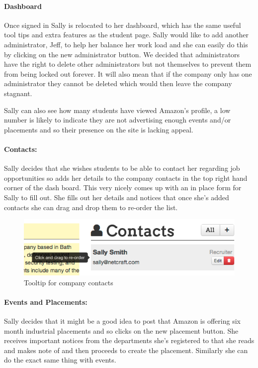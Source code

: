   \paragraph{Dashboard}
    Once signed in Sally is relocated to her dashboard, which has the same useful tool tips and extra features as the student page.
    Sally would like to add another administrator, Jeff, to help her balance her work load and she can easily do this by clicking on the new administrator button. We decided that administrators have the right to delete other administrators but not themselves to prevent them from being locked out forever. It will also mean that if the company only has one administrator they cannot be deleted which would then leave the company stagnant.

    Sally can also see how many students have viewed Amazon's profile, a low number is likely to indicate they are not advertising enough events and/or placements and so their presence on the site is lacking appeal.


  \paragraph{Contacts:}
    Sally decides that she wishes students to be able to contact her regarding job opportunities so adds her details to the company contacts in the top right hand corner of the dash board. This very nicely comes up with an in place form for Sally to fill out.
    She fills out her details and notices that once she's added contacts she can drag and drop them to re-order the list.

    \begin{figure}[H]\centering
    \includegraphics[scale=0.5]{images/user_experiences/company/netcraft_company_contact_tooltip}
    \caption{Tooltip for company contacts}
    \end{figure}

  \paragraph{Events and Placements:}
    Sally decides that it might be a good idea to post that Amazon is offering six month industrial placements and so clicks on the new placement button.
    She receives important notices from the departments she's registered to that she reads and makes note of and then proceeds to create the placement.
    Similarly she can do the exact same thing with events.

